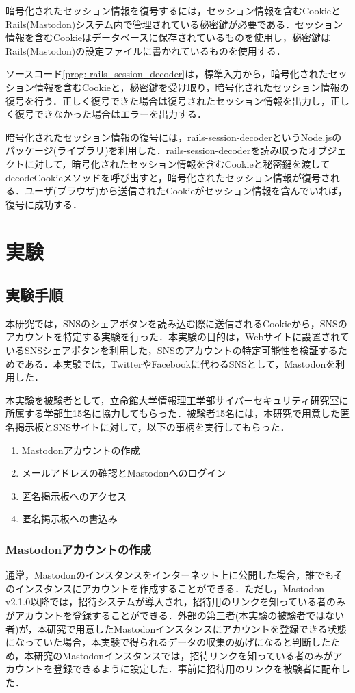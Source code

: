 \documentclass[10pt, a4paper]{jreport}
\begin{document}
暗号化されたセッション情報を復号するには，セッション情報を含むCookieとRails(Mastodon)システム内で管理されている秘密鍵が必要である．セッション情報を含むCookieはデータベースに保存されているものを使用し，秘密鍵はRails(Mastodon)の設定ファイルに書かれているものを使用する．

ソースコード\ref{prog: rails_session_decoder}は，標準入力から，暗号化されたセッション情報を含むCookieと，秘密鍵を受け取り，暗号化されたセッション情報の復号を行う．正しく復号できた場合は復号されたセッション情報を出力し，正しく復号できなかった場合はエラーを出力する．

暗号化されたセッション情報の復号には，rails-session-decoderというNode.jsのパッケージ(ライブラリ)を利用した\cite{npm_rails_session_decoder}．rails-session-decoderを読み取ったオブジェクトに対して，暗号化されたセッション情報を含むCookieと秘密鍵を渡してdecodeCookieメソッドを呼び出すと，暗号化されたセッション情報が復号される．ユーザ(ブラウザ)から送信されたCookieがセッション情報を含んでいれば，復号に成功する．






\chapter{実験}
\section{実験手順}
本研究では，SNSのシェアボタンを読み込む際に送信されるCookieから，SNSのアカウントを特定する実験を行った．本実験の目的は，Webサイトに設置されているSNSシェアボタンを利用した，SNSのアカウントの特定可能性を検証するためである．本実験では，TwitterやFacebookに代わるSNSとして，Mastodonを利用した．

本実験を被験者として，立命館大学情報理工学部サイバーセキュリティ研究室に所属する学部生15名に協力してもらった．被験者15名には，本研究で用意した匿名掲示板とSNSサイトに対して，以下の事柄を実行してもらった．

\begin{enumerate}
\item{Mastodonアカウントの作成}
\item{メールアドレスの確認とMastodonへのログイン}
\item{匿名掲示板へのアクセス}
\item{匿名掲示板への書込み}
\end{enumerate}

\subsection{Mastodonアカウントの作成}
通常，Mastodonのインスタンスをインターネット上に公開した場合，誰でもそのインスタンスにアカウントを作成することができる．ただし，Mastodon v2.1.0以降では，招待システムが導入され，招待用のリンクを知っている者のみがアカウントを登録することができる\cite{invite_system}．外部の第三者(本実験の被験者ではない者)が，本研究で用意したMastodonインスタンスにアカウントを登録できる状態になっていた場合，本実験で得られるデータの収集の妨げになると判断したため，本研究のMastodonインスタンスでは，招待リンクを知っている者のみがアカウントを登録できるように設定した．事前に招待用のリンクを被験者に配布した．
\end{document}
